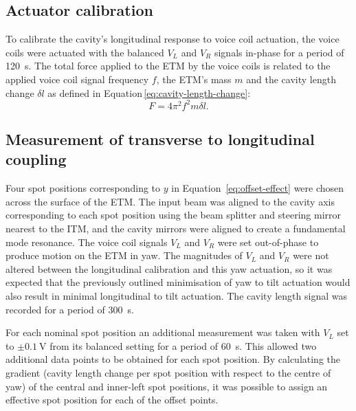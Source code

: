 \subsection{Actuator calibration}

To calibrate the cavity's longitudinal response to voice coil actuation, the voice coils were actuated with the balanced $V_L$ and $V_R$ signals in-phase for a period of \SI{120}{\second}. The total force applied to the \gls{ETM} by the voice coils is related to the applied voice coil signal frequency $f$, the \gls{ETM}'s mass $m$ and the cavity length change $\delta l$ as defined in Equation\,\ref{eq:cavity-length-change}:
\begin{equation}
  F = 4 \pi^2 f^2 m \delta l.
  \label{eq:force-calibration}
\end{equation}

\subsection{\label{sec:length-changes}Measurement of transverse to longitudinal coupling}


Four spot positions corresponding to $y$ in Equation~\ref{eq:offset-effect} were chosen across the surface of the \gls{ETM}. The input beam was aligned to the cavity axis corresponding to each spot position using the beam splitter and steering mirror nearest to the \gls{ITM}, and the cavity mirrors were aligned to create a fundamental mode resonance. The voice coil signals $V_L$ and $V_R$ were set out-of-phase to produce motion on the \gls{ETM} in yaw. The magnitudes of $V_L$ and $V_R$ were not altered between the longitudinal calibration and this yaw actuation, so it was expected that the previously outlined minimisation of yaw to tilt actuation would also result in minimal longitudinal to tilt actuation. The cavity length signal was recorded for a period of \SI{300}{\second}.

For each nominal spot position an additional measurement was taken with $V_L$ set to $\pm \SI{0.1}{\volt}$ from its balanced setting for a period of \SI{60}{\second}. This allowed two additional data points to be obtained for each spot position. By calculating the gradient (cavity length change per spot position with respect to the centre of yaw) of the central and inner-left spot positions, it was possible to assign an effective spot position for each of the offset points.

